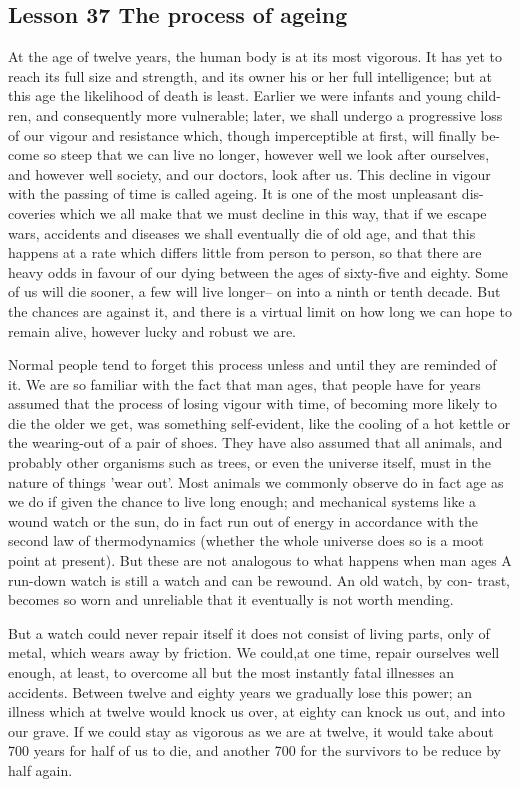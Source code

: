 \documentclass[kindlepaper]{BHCexam4kindle}
\begin{document}
\subsection{Lesson 37
The process of ageing}
\par
At the age of twelve years, the human body is at its most vigorous. It has yet to
reach its full size and strength, and its owner his or her full intelligence; but at
this age the likelihood of death is least. Earlier we were infants and young child-
ren, and consequently more vulnerable; later, we shall undergo a progressive loss
of our vigour and resistance which, though imperceptible at first, will finally be-
come so steep that we can live no longer, however well we look after ourselves,
and however well society, and our doctors, look after us. This decline in vigour
with the passing of time is called ageing. It is one of the most unpleasant dis-
coveries which we all make that we must decline in this way, that if we escape
wars, accidents and diseases we shall eventually die of old age, and that this
happens at a rate which differs little from person to person, so that there are
heavy odds in favour of our dying between the ages of sixty-five and eighty. Some
of us will die sooner, a few will live longer-- on into a ninth or tenth decade. But
the chances are against it, and there is a virtual limit on how long we can hope
to remain alive, however lucky and robust we are.
\par
Normal people tend to forget this process unless and until they are reminded
of it. We are so familiar with the fact that man ages, that people have for years
assumed that the process of losing vigour with time, of becoming more likely to
die the older we get, was something self-evident, like the cooling of a hot kettle
or the wearing-out of a pair of shoes. They have also assumed that all animals,
and probably other organisms such as trees, or even the universe itself, must in
the nature of things 'wear out'. Most animals we commonly observe do in fact
age as we do if given the chance to live long enough; and mechanical systems like
a wound watch or the sun, do in fact run out of energy in accordance with the
second law of thermodynamics (whether the whole universe does so is a moot
point at present). But these are not analogous to what happens when man ages
A run-down watch is still a watch and can be rewound. An old watch, by con-
trast, becomes so worn and unreliable that it eventually is not worth mending.
\par
But a watch could never repair itself it does not consist of living parts, only of
metal, which wears away by friction. We could,at one time, repair ourselves
well enough, at least, to overcome all but the most instantly fatal illnesses an
accidents. Between twelve and eighty years we gradually lose this power; an
illness which at twelve would knock us over, at eighty can knock us out, and into
our grave. If we could stay as vigorous as we are at twelve, it would take about
700 years for half of us to die, and another 700 for the survivors to be reduce
by half again.
\clearpage
\end{document}
